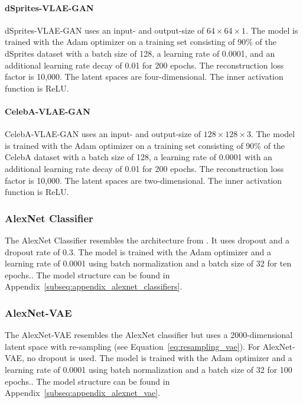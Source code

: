 \paragraph{dSprites-\ac{VLAE}-\ac{GAN}} dSprites-\ac{VLAE}-\ac{GAN} uses an input- and output-size of $64\times 64\times 1$.
The model is trained with the Adam optimizer on a training set consisting of 90\% of the dSprites dataset with a batch size of 128, a learning rate of 0.0001, and an additional learning rate decay of 0.01 for 200 epochs.
The reconstruction loss factor is 10,000.
The latent spaces are four-dimensional.
The inner activation function is ReLU.

\paragraph{CelebA-\ac{VLAE}-\ac{GAN}} CelebA-\ac{VLAE}-\ac{GAN} uses an input- and output-size of $128\times 128\times 3$.
The model is trained with the Adam optimizer on a training set consisting of 90\% of the CelebA dataset with a batch size of 128, a learning rate of 0.0001 with an additional learning rate decay of 0.01 for 200 epochs.
The reconstruction loss factor is 10,000.
The latent spaces are two-dimensional.
The inner activation function is ReLU.

\subsubsection{AlexNet Classifier}\label{subsubsec:alexnet_classifier}
The AlexNet Classifier resembles the architecture from \citet{krizhevsky2012imagenet}.
It uses dropout and a dropout rate of 0.3.
The model is trained with the Adam optimizer and a learning rate of 0.0001 using batch normalization and a batch size of 32 for ten epochs..
The model structure can be found in Appendix~\ref{subseq:appendix_alexnet_classifiers}.

\subsubsection{AlexNet-\ac{VAE}}\label{subsubsec:alexnet_vae}
The AlexNet-\ac{VAE} resembles the AlexNet classifier but uses a 2000-dimensional latent space with re-sampling (see Equation~\ref{eq:resampling_vae}).
For AlexNet-\ac{VAE}, no dropout is used.
The model is trained with the Adam optimizer and a learning rate of 0.0001 using batch normalization and a batch size of 32 for 100 epochs..
The model structure can be found in Appendix~\ref{subseq:appendix_alexnet_vae}.